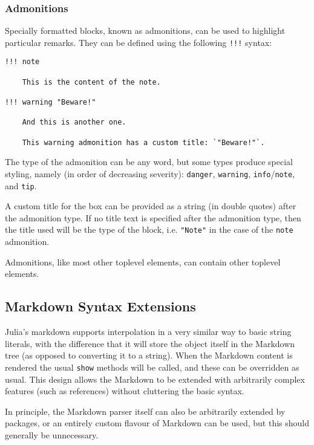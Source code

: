 \subsubsection{Admonitions}
Specially formatted blocks, known as admonitions, can be used to highlight particular remarks. They can be defined using the following \texttt{!!!} syntax:

\begin{verbatim}
!!! note

    This is the content of the note.

!!! warning "Beware!"

    And this is another one.

    This warning admonition has a custom title: `"Beware!"`.
\end{verbatim}
The type of the admonition can be any word, but some types produce special styling, namely (in order of decreasing severity): \texttt{danger}, \texttt{warning}, \texttt{info}/\texttt{note}, and \texttt{tip}.

A custom title for the box can be provided as a string (in double quotes) after the admonition type. If no title text is specified after the admonition type, then the title used will be the type of the block, i.e. \texttt{"Note"} in the case of the \texttt{note} admonition.

Admonitions, like most other toplevel elements, can contain other toplevel elements.

\subsection{Markdown Syntax Extensions}
Julia's markdown supports interpolation in a very similar way to basic string literals, with the difference that it will store the object itself in the Markdown tree (as opposed to converting it to a string). When the Markdown content is rendered the usual \texttt{show} methods will be called, and these can be overridden as usual. This design allows the Markdown to be extended with arbitrarily complex features (such as references) without cluttering the basic syntax.

In principle, the Markdown parser itself can also be arbitrarily extended by packages, or an entirely custom flavour of Markdown can be used, but this should generally be unnecessary.

